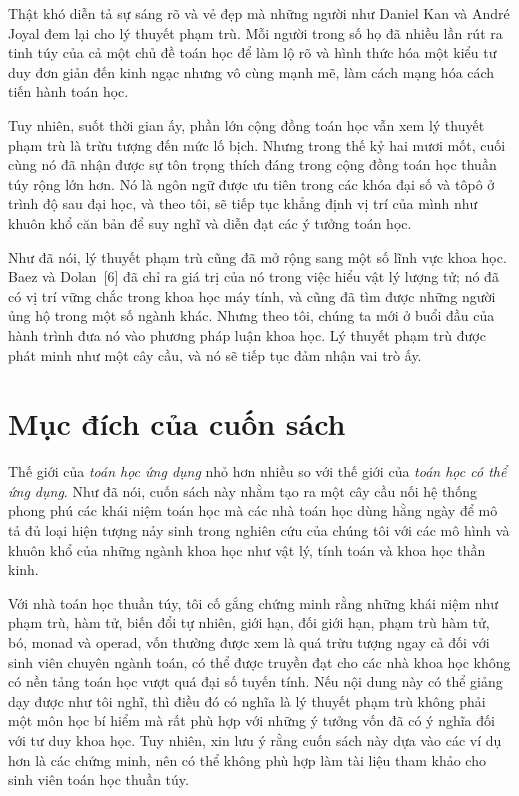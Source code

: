 Thật khó diễn tả sự sáng rõ và vẻ đẹp mà những người như Daniel Kan và André Joyal đem lại cho lý thuyết phạm trù. Mỗi người trong số họ đã nhiều lần rút ra tinh túy của cả một chủ đề toán học để làm lộ rõ và hình thức hóa một kiểu tư duy đơn giản đến kinh ngạc nhưng vô cùng mạnh mẽ, làm cách mạng hóa cách tiến hành toán học.

Tuy nhiên, suốt thời gian ấy, phần lớn cộng đồng toán học vẫn xem lý thuyết phạm trù là trừu tượng đến mức lố bịch. Nhưng trong thế kỷ hai mươi mốt, cuối cùng nó đã nhận được sự tôn trọng thích đáng trong cộng đồng toán học thuần túy rộng lớn hơn. Nó là ngôn ngữ được ưu tiên trong các khóa đại số và tôpô ở trình độ sau đại học, và theo tôi, sẽ tiếp tục khẳng định vị trí của mình như khuôn khổ căn bản để suy nghĩ và diễn đạt các ý tưởng toán học.

Như đã nói, lý thuyết phạm trù cũng đã mở rộng sang một số lĩnh vực khoa học. Baez và Dolan~[6] đã chỉ ra giá trị của nó trong việc hiểu vật lý lượng tử; nó đã có vị trí vững chắc trong khoa học máy tính, và cũng đã tìm được những người ủng hộ trong một số ngành khác. Nhưng theo tôi, chúng ta mới ở buổi đầu của hành trình đưa nó vào phương pháp luận khoa học. Lý thuyết phạm trù được phát minh như một cây cầu, và nó sẽ tiếp tục đảm nhận vai trò ấy.

\section{Mục đích của cuốn sách}

Thế giới của \emph{toán học ứng dụng} nhỏ hơn nhiều so với thế giới của \emph{toán học có thể ứng dụng}. Như đã nói, cuốn sách này nhằm tạo ra một cây cầu nối hệ thống phong phú các khái niệm toán học mà các nhà toán học dùng hằng ngày để mô tả đủ loại hiện tượng nảy sinh trong nghiên cứu của chúng tôi với các mô hình và khuôn khổ của những ngành khoa học như vật lý, tính toán và khoa học thần kinh.

Với nhà toán học thuần túy, tôi cố gắng chứng minh rằng những khái niệm như phạm trù, hàm tử, biến đổi tự nhiên, giới hạn, đối giới hạn, phạm trù hàm tử, bó, monad và operad, vốn thường được xem là quá trừu tượng ngay cả đối với sinh viên chuyên ngành toán, có thể được truyền đạt cho các nhà khoa học không có nền tảng toán học vượt quá đại số tuyến tính. Nếu nội dung này có thể giảng dạy được như tôi nghĩ, thì điều đó có nghĩa là lý thuyết phạm trù không phải một môn học bí hiểm mà rất
phù hợp với những ý tưởng vốn đã có ý nghĩa đối với tư duy khoa học. Tuy nhiên, xin lưu ý rằng cuốn sách này dựa vào các ví dụ hơn là các chứng minh, nên có thể không phù hợp làm tài liệu tham khảo cho sinh viên toán học thuần túy.

